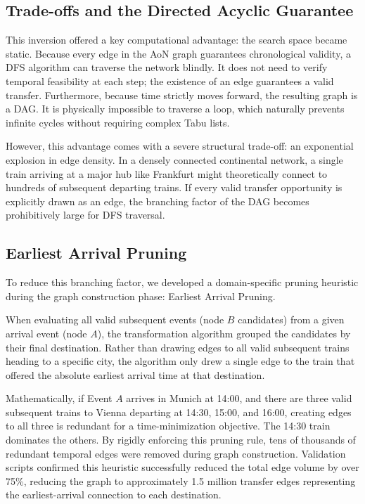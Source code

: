 \subsection{Trade-offs and the Directed Acyclic Guarantee}
\label{subsec:aon_tradeoffs_dag}

This inversion offered a key computational advantage: the search space became static. Because every edge in the AoN graph guarantees chronological validity, a DFS algorithm can traverse the network blindly. It does not need to verify temporal feasibility at each step; the existence of an edge guarantees a valid transfer. Furthermore, because time strictly moves forward, the resulting graph is a DAG. It is physically impossible to traverse a loop, which naturally prevents infinite cycles without requiring complex Tabu lists.

\medskip

However, this advantage comes with a severe structural trade-off: an exponential explosion in edge density. In a densely connected continental network, a single train arriving at a major hub like Frankfurt might theoretically connect to hundreds of subsequent departing trains. If every valid transfer opportunity is explicitly drawn as an edge, the branching factor of the DAG becomes prohibitively large for DFS traversal.

\subsection{Earliest Arrival Pruning}
\label{subsec:earliest_arrival_pruning}

To reduce this branching factor, we developed a domain-specific pruning heuristic during the graph construction phase: Earliest Arrival Pruning.

\medskip

When evaluating all valid subsequent events (node $B$ candidates) from a given arrival event (node $A$), the transformation algorithm grouped the candidates by their final destination. Rather than drawing edges to all valid subsequent trains heading to a specific city, the algorithm only drew a single edge to the train that offered the absolute earliest arrival time at that destination.

\medskip

Mathematically, if Event $A$ arrives in Munich at 14:00, and there are three valid subsequent trains to Vienna departing at 14:30, 15:00, and 16:00, creating edges to all three is redundant for a time-minimization objective. The 14:30 train dominates the others. By rigidly enforcing this pruning rule, tens of thousands of redundant temporal edges were removed during graph construction. Validation scripts confirmed this heuristic successfully reduced the total edge volume by over 75\%, reducing the graph to approximately 1.5 million transfer edges representing the earliest-arrival connection to each destination.

